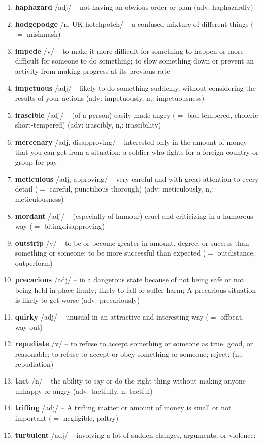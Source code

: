 \begin{enumerate}[wide,labelindent=0pt]
\item \textbf{haphazard} /adj/ -- not having an obvious order or plan (adv: haphazardly)
\item \textbf{hodgepodge} /n, UK hotchpotch/ -- a confused mixture of different things ($=$ mishmash)
\item \textbf{impede} /v/ -- to make it more difficult for something to happen or more difficult for someone to do something; to slow something down or prevent an activity from making progress at its previous rate
\item \textbf{impetuous} /adj/ -- likely to do something suddenly, without considering the results of your actions (adv: impetuously, n,: impetuousness)
\item \textbf{irascible} /adj/ -- (of a person) easily made angry ($=$ bad-tempered, choleric short-tempered) (adv: irascibly, n,: irascibility)
\item \textbf{mercenary} /adj, disapproving/ -- interested only in the amount of money that you can get from a situation; a soldier who fights for a foreign country or group for pay
\item \textbf{meticulous} /adj, approving/ -- very careful and with great attention to every detail ($=$ careful, punctilious thorough) (adv: meticulously, n,: meticulousness)
\item \textbf{mordant} /adj/ -- (especially of humour) cruel and criticizing in a humorous way ($=$ bitingdisapproving)
\item \textbf{outstrip} /v/ -- to be or become greater in amount, degree, or success than something or someone; to be more successful than expected ($=$ outdistance, outperform)
\item \textbf{precarious} /adj/ -- in a dangerous state because of not being safe or not being held in place firmly; likely to fall or suffer harm; A precarious situation is likely to get worse (adv: precariously)
\item \textbf{quirky} /adj/ -- unusual in an attractive and interesting way ($=$ offbeat, way-out)
\item \textbf{repudiate} /v/ -- to refuse to accept something or someone as true, good, or reasonable; to refuse to accept or obey something or someone; reject; (n,: repudiation)
\item \textbf{tact} /n/ -- the ability to say or do the right thing without making anyone unhappy or angry (adv: tactfully, n: tactful)
\item \textbf{trifling} /adj/ -- A trifling matter or amount of money is small or not important ($=$ negligible, paltry)
\item \textbf{turbulent} /adj/ -- involving a lot of sudden changes, arguments, or violence:
\end{enumerate}

